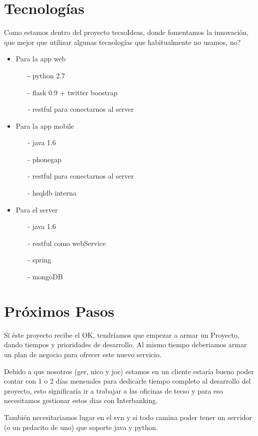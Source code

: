 \documentclass[spanish, DIV=calc, paper=a4, fontsize=11pt, twocolumn]{scrartcl}	 %
\begin{document}
\section{Tecnologías}
Como estamos dentro del proyecto tecsoIdeas, donde fomentamos la innovación, que mejor que utilizar algunas tecnologías que habitualmente no usamos, no?
	
	\begin{itemize}

		\item Para la app web
				
			\begin{itemize}
				\item[-] python 2.7
				\item[-] flask 0.9 + twitter boostrap
				\item[-] restful para conectarnos al server
			\end{itemize}			
					  
		\item Para la app mobile
				
			\begin{itemize}
				\item[-] java 1.6
				\item[-] phonegap
				\item[-] restful para conectarnos al server
				\item[-] hsqldb interna
			\end{itemize}

		\item Para el server
			\begin{itemize}
				\item[-] java 1.6
				\item[-] restful como webService
				\item[-] spring
				\item[-] mongoDB
			\end{itemize}

	\end{itemize}


\section{Próximos Pasos}
Si éste proyecto recibe el OK, tendríamos que empezar a armar un Proyecto, dando tiempos y prioridades de desarrollo. Al mismo tiempo deberiamos armar un plan de negocio para ofrecer este nuevo servicio.

Debido a que nosotros (ger, nico y joe) estamos en un cliente estaría bueno poder contar con 1 o 2 días mensuales para dedicarle tiempo completo al desarrollo del proyecto, esto significaría ir a trabajar a las oficinas de tecso y para eso necesitamos gestionar estos dias con Interbanking. 
				
También necesitariamos lugar en el svn y si todo camina poder tener un servidor (o un pedacito de uno) que soporte java y python.
\end{document}
